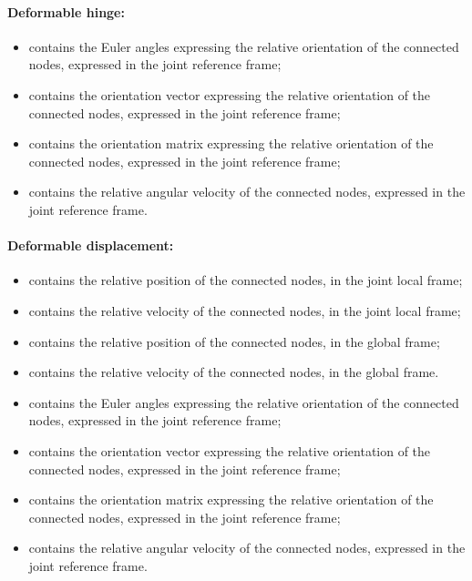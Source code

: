 \paragraph{Deformable hinge:}
\begin{itemize}
\item {} contains the Euler angles 
  expressing the relative orientation of the connected nodes, expressed in 
  the joint reference frame;
\item {} contains the orientation vector
  expressing the relative orientation of the connected nodes, expressed in 
  the joint reference frame;
\item {} contains the orientation matrix
  expressing the relative orientation of the connected nodes, expressed in 
  the joint reference frame;
\item {} contains the relative angular
  velocity of the connected nodes, expressed in the joint reference frame.
\end{itemize}

\paragraph{Deformable displacement:}
\begin{itemize}
\item {} contains the relative position
  of the connected nodes, in the joint local frame;
\item {} contains the relative velocity
  of the connected nodes, in the joint local frame;
\item {} contains the relative position
  of the connected nodes, in the global frame;
\item {} contains the relative velocity
  of the connected nodes, in the global frame. 
\item {} contains the Euler angles 
  expressing the relative orientation of the connected nodes, expressed in 
  the joint reference frame;
\item {} contains the orientation vector
  expressing the relative orientation of the connected nodes, expressed in 
  the joint reference frame;
\item {} contains the orientation matrix
  expressing the relative orientation of the connected nodes, expressed in 
  the joint reference frame;
\item {} contains the relative angular
  velocity of the connected nodes, expressed in the joint reference frame.
\end{itemize}

